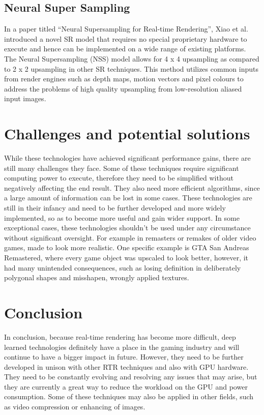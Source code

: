 \documentclass[10pt,oneside,english,a4paper]{article}
\begin{document}
\subsection{Neural Super Sampling} \label{deep:neural}

In a paper titled “Neural Supersampling for Real-time Rendering”, Xiao et al. introduced a novel SR model that requires no special proprietary hardware to execute and hence can be implemented on a wide range of existing platforms. The Neural Supersampling (NSS) model allows for 4 x 4 upsampling as compared to 2 x 2 upsampling in other SR techniques. This method utilizes common inputs from render engines such as depth maps, motion vectors and pixel colours to address the problems of high quality upsampling from low-resolution aliased input images.\cite{9441822}

\section{Challenges and potential solutions} \label{challenges}

While these technologies have achieved significant performance gains, there are still many challenges they face. Some of these techniques require significant computing power to execute, therefore they need to be simplified without negatively affecting the end result. They also need more efficient algorithms, since a large amount of information can be lost in some cases. These technologies are still in their infancy and need to be further developed and more widely implemented, so as to become more useful and gain wider support. In some exceptional cases, these technologies shouldn't be used under any circumstance without significant oversight. For example in remasters or remakes of older video games, made to look more realistic. One specific example is GTA San Andreas Remastered, where every game object was upscaled to look better, however, it had many unintended consequences, such as losing definition in deliberately polygonal shapes and misshapen, wrongly applied textures.

\section{Conclusion} \label{conclusion}

In conclusion, because real-time rendering has become more difficult, deep learned technologies definitely have a place in the gaming industry and will continue to have a bigger impact in future. However, they need to be further developed in unison with other RTR techniques and also with GPU hardware. They need to be constantly evolving and resolving any issues that may arise, but they are currently a great way to reduce the workload on the GPU and power consumption. Some of these techniques may also be applied in other fields, such as video compression\cite{9675356} or enhancing of images\cite{9792975}.



\end{document}
